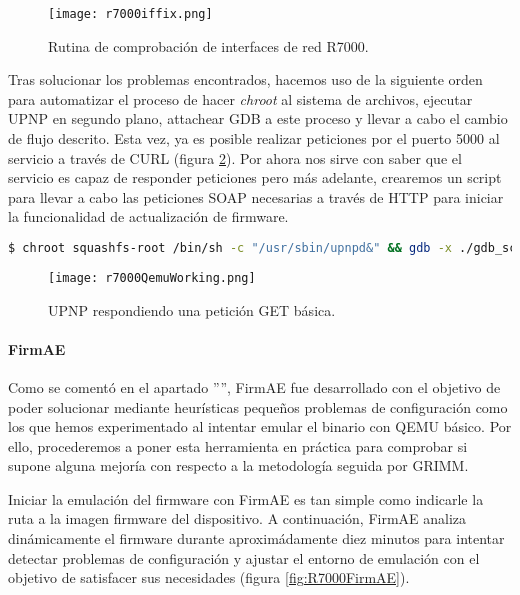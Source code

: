 \begin{figure}[H]
    \centering
    \texttt{[image: r7000iffix.png]}
    \caption{Rutina de comprobación de interfaces de red R7000.}
    \label{fig:R7000iffix}
\end{figure}

Tras solucionar los problemas encontrados, hacemos uso de la siguiente orden para automatizar el proceso de hacer \textit{chroot}
al sistema de archivos, ejecutar UPNP en segundo plano, attachear GDB a este proceso y llevar a cabo el cambio de flujo descrito.
Esta vez, ya es posible realizar peticiones por el puerto 5000 al servicio a través de CURL (figura \ref{fig:R7000QemuWorking}). Por ahora nos sirve 
con saber que el servicio es capaz de responder peticiones pero más adelante, crearemos un script para llevar a cabo las peticiones 
SOAP necesarias a través de HTTP para iniciar la funcionalidad de actualización de firmware.

\begin{lstlisting}[language=bash, breaklines]
    $ chroot squashfs-root /bin/sh -c "/usr/sbin/upnpd&" && gdb -x ./gdb_script -q -p `pgrep upnpd`
\end{lstlisting}

\begin{figure}[H]
    \centering
    \texttt{[image: r7000QemuWorking.png]}
    \caption{UPNP respondiendo una petición GET básica.}
    \label{fig:R7000QemuWorking}
\end{figure}

\paragraph{FirmAE}
Como se comentó en el apartado '''', FirmAE fue desarrollado con el objetivo de poder solucionar mediante heurísticas 
pequeños problemas de configuración como los que hemos experimentado al intentar emular el binario con QEMU básico. Por ello, 
procederemos a poner esta herramienta en práctica para comprobar si supone alguna mejoría con respecto a la metodología seguida
por GRIMM\cite{r7000GRIMM}.\bigskip

Iniciar la emulación del firmware con FirmAE es tan simple como indicarle la ruta a la imagen firmware del dispositivo. A continuación, 
FirmAE analiza dinámicamente el firmware durante aproximádamente diez minutos para intentar detectar problemas de configuración y 
ajustar el entorno de emulación con el objetivo de satisfacer sus necesidades (figura \ref{fig:R7000FirmAE}). 

